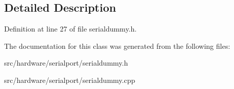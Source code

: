 \subsection{Detailed Description}


Definition at line 27 of file serialdummy.\-h.



The documentation for this class was generated from the following files\-:\begin{DoxyCompactItemize}
\item 
src/hardware/serialport/serialdummy.\-h\item 
src/hardware/serialport/serialdummy.\-cpp\end{DoxyCompactItemize}

